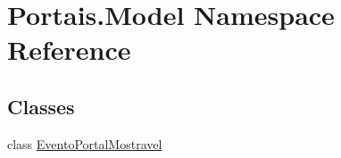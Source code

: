 \hypertarget{namespace_portais_1_1_model}{}\section{Portais.\+Model Namespace Reference}
\label{namespace_portais_1_1_model}
\subsection*{Classes}
\begin{DoxyCompactItemize}
\item 
class \hyperlink{class_portais_1_1_model_1_1_evento_portal_mostravel}{Evento\+Portal\+Mostravel}
\end{DoxyCompactItemize}
